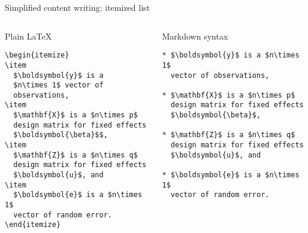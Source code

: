 \documentclass[
  10pt,
  ignorenonframetext,
  aspectratio=169,
]{beamer}
\begin{document}
\begin{frame}[fragile]{Simplified content writing: itemized list}
\protect\hypertarget{simplified-content-writing-itemized-list}{}

\begin{columns}[T]
\begin{column}{0.48\textwidth}
\begin{block}{Plain \LaTeX}

\small

\begin{verbatim}
\begin{itemize}
\item 
  $\boldsymbol{y}$ is a 
  $n\times 1$ vector of 
  observations,
\item
  $\mathbf{X}$ is a $n\times p$ 
  design matrix for fixed effects
  $\boldsymbol{\beta}$$,
\item
  $\mathbf{Z}$ is a $n\times q$ 
  design matrix for fixed effects
  $\boldsymbol{u}$, and
\item
  $\boldsymbol{e}$ is a $n\times 1$ 
  vector of random error.
\end{itemize}
\end{verbatim}

\end{block}
\end{column}

\begin{column}{0.48\textwidth}
\begin{block}{Markdown syntax}

\small

\vspace{0.5cm}

\begin{verbatim}
* $\boldsymbol{y}$ is a $n\times 1$ 
  vector of observations,
  
* $\mathbf{X}$ is a $n\times p$ 
  design matrix for fixed effects 
  $\boldsymbol{\beta}$,
  
* $\mathbf{Z}$ is a $n\times q$ 
  design matrix for fixed effects 
  $\boldsymbol{u}$, and
  
* $\boldsymbol{e}$ is a $n\times 1$ 
  vector of random error.
\end{verbatim}

\end{block}
\end{column}
\end{columns}

\end{frame}
\end{document}
